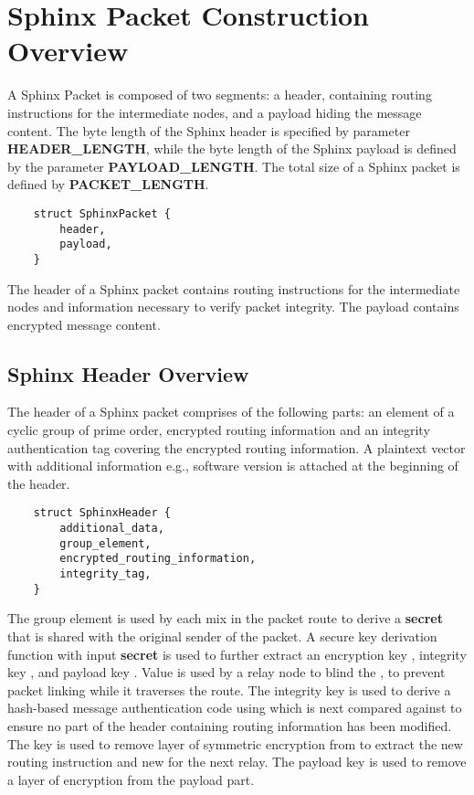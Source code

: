 \section{Sphinx Packet Construction Overview}\label{sec:construction}

A Sphinx Packet is composed of two segments: a header, containing routing instructions for the intermediate nodes, and a payload hiding the message content. The byte length of the Sphinx header is specified by parameter \textbf{HEADER\_LENGTH}, while the byte length of the Sphinx payload is defined by the parameter \textbf{PAYLOAD\_LENGTH}. The total size of a Sphinx packet is defined by \textbf{PACKET\_LENGTH}.
\begin{verbatim}
    struct SphinxPacket {
        header,
        payload,
    }
\end{verbatim}

The header of a Sphinx packet contains routing instructions for the intermediate nodes and information necessary to verify packet integrity. The payload contains encrypted message content.

\subsection{Sphinx Header Overview}\label{sec:header}

The header of a Sphinx packet comprises of the following parts: an element of a cyclic group of prime order, encrypted routing information and an integrity authentication tag covering the encrypted routing information. A plaintext vector with additional information e.g., software version is attached at the beginning of the header.

\begin{verbatim}
    struct SphinxHeader {
        additional_data,
        group_element,
        encrypted_routing_information,
        integrity_tag,
    }
\end{verbatim}

The group element is used by each mix in the packet route to derive a \textbf{secret} that is shared with the original sender of the packet. A secure key derivation function \kdf with input \textbf{secret} is used to further extract an encryption key \hek, integrity key \ik, \blind and payload key \pk. Value \blind is used by a relay node to blind the \alp, to prevent packet linking while it traverses the route. The integrity key \ik is used to derive a hash-based message authentication code using \bet which is next compared against \tag to ensure no part of the header containing routing information has been modified.
The key \hek is used to remove layer of symmetric encryption from \bet to extract the new routing instruction \bet and new \tag for the next relay. The payload key \pk is used to remove a layer of encryption from the payload part.


